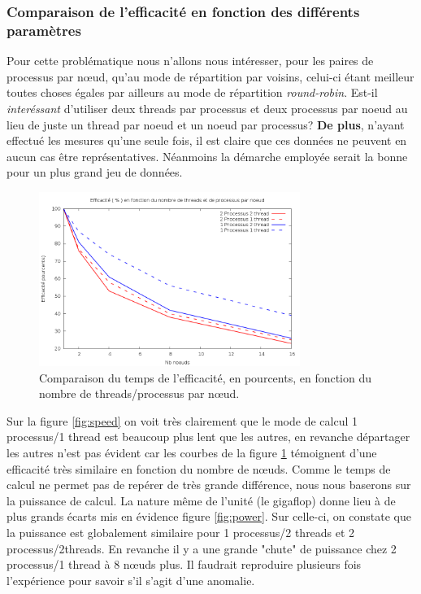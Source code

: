 \documentclass[	DIV=calc,%
							paper=a4,%
							fontsize=11pt,%
							twocolumn]{scrartcl}	 					%
\begin{document}
\subsubsection*{Comparaison de l'efficacité en fonction des différents paramètres}
Pour cette problématique nous n'allons nous intéresser, pour les paires de processus par nœud, qu'au mode de répartition par voisins, celui-ci étant meilleur toutes choses égales par ailleurs au mode de répartition \textit{round-robin}. \newline
Est-il \textit{interéssant} d'utiliser deux threads par processus et deux processus par noeud au lieu de juste un thread par noeud et un noeud par processus?\newline
\textbf{De plus}, n'ayant effectué les mesures qu'une seule fois, il est claire que ces données ne peuvent en aucun cas être représentatives. Néanmoins la démarche employée serait la bonne pour un plus grand jeu de données.
\begin{figure}
\includegraphics[keepaspectratio,width=8.5cm]{img/eff.png} 
\caption{Comparaison du temps de l'efficacité, en pourcents, en fonction du nombre de threads/processus par nœud. }
\label{fig:eff}
\end{figure}
Sur la figure \ref{fig:speed} on voit très clairement que le mode de calcul 1 processus/1 thread est beaucoup plus lent que les autres, en revanche départager les autres n'est pas évident car les courbes de la figure \ref{fig:eff} témoignent d'une efficacité très similaire en fonction du nombre de nœuds. Comme le temps de calcul ne  permet pas de repérer de très grande différence, nous nous baserons sur la puissance de calcul. La nature même de l'unité (le gigaflop) donne lieu à de plus grands écarts mis en évidence figure \ref{fig:power}. Sur celle-ci, on constate que la puissance est globalement similaire pour 1 processus/2 threads et 2 processus/2threads. En revanche il y a une grande "chute" de puissance chez 2 processus/1 thread  à 8 nœuds plus. Il faudrait reproduire plusieurs fois l'expérience pour savoir s'il s'agit d'une anomalie.
\end{document}
